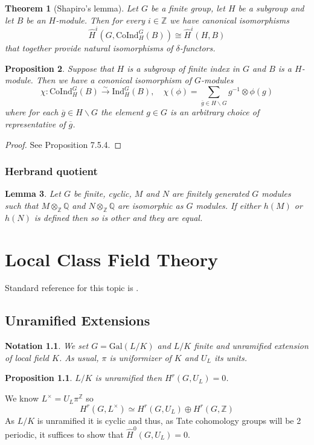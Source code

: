 \documentclass[twoside, 12pt]{iiser-thesis}
\newtheorem{thm}{Theorem}[section]
\newtheorem{prop}[thm]{ Proposition}
\newtheorem{lem}[thm]{ Lemma}
\newtheorem{notation}{ Notation}[section]
\newcommand{\Z}{\mathbb{Z}}
\newcommand{\Q}{\mathbb{Q}}
\begin{document}
\begin{thm}[Shapiro's lemma]\label{shapiro}
Let $G$ be a finite group, let $H$ be a subgroup and let $B$ be an $H$-module. Then for every $i\in \Z$ we have canonical isomorphisms \[ \hat H^i (G, \text{CoInd}^G_H(B)) \cong \hat H^i(H,B)\] that together provide natural isomorphisms of $\delta$-functors.
\end{thm}
\begin{prop}
Suppose that $H$ is a subgroup of finite index in $G$ and $B$ is a $H$-module. Then we have a cononical isomorphism of $G$-modules \[\chi: \text{CoInd}^G_H(B) \xrightarrow{\sim}\text{Ind}^G_H(B), \quad \chi (\phi) = \sum _{\overline g \in H \backslash G } g^{-1}\otimes \phi (g)\]
where for each $\overline g \in H \backslash G$ the element $g\in G$ is an arbitrary choice of representative of $\overline g$.
\end{prop}
\begin{proof}
See \cite{sharifi} Proposition 7.5.4.
\end{proof}



\subsection{Herbrand quotient}
\begin{lem}\label{herbrandtensorq}
Let $G$ be finite, cyclic, $M$ and $N$ are finitely generated $G$ modules such that $M \otimes _\Z \Q$ and $N \otimes _\Z \Q$ are isomorphic as $G$ modules. If either $h(M)$ or $h(N)$ is defined then so is other and they are equal.
\end{lem}













\chapter{Local Class Field Theory}
Standard reference for this topic is \cite{milneCFT}.
\section{Unramified Extensions}\label{sec1}
\begin{notation} 
We set $G= \text{Gal} (L/K)$ and $L/K$ finite and unramified extension of local field $K$. As usual, $\pi$ is uniformizer of $K$ and $U_L$ its units.
    
\end{notation} 
\begin{prop}
$L/K$ is unramified then $H^r(G,U_L)=0$.
\end{prop}
We know $ L^\times =U_L \pi ^ \mathbb  Z$ so $$H^r(G, L^\times ) \simeq H^r(G, U_L) \oplus H^r(G, \Z)$$
As $L/K$ is unramified it is cyclic and thus, as Tate cohomology groups will be 2 periodic, it suffices to show that $\hat H ^0 (G, U_L) =0$.
\end{document}
